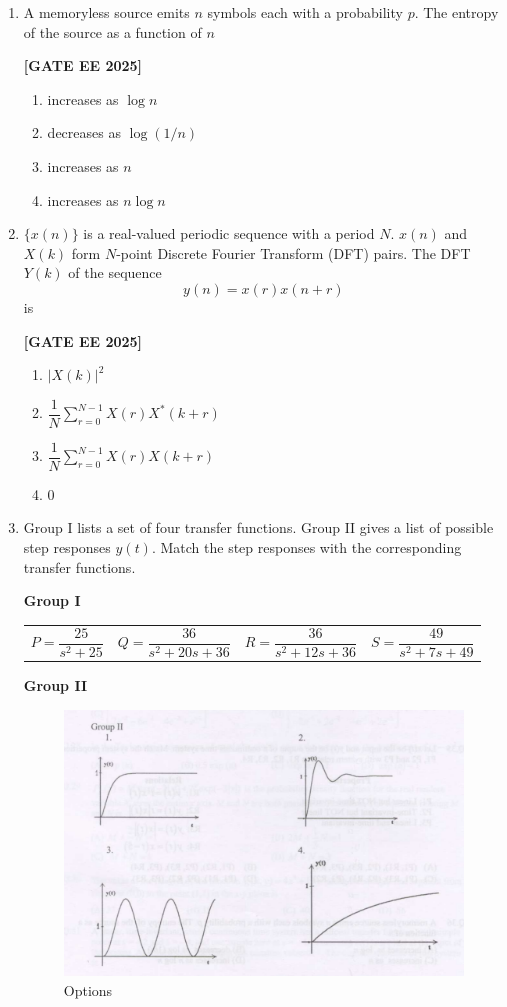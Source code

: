 \documentclass[12pt]{article}
\begin{document}
\begin{enumerate}[leftmargin=*, label=\textbf{Q.\arabic*:}]
\item A memoryless source emits $n$ symbols each with a probability $p$. The entropy of the source as a function of $n$
 
\noindent \textbf{[GATE EE 2025]}
\begin{enumerate}
  \item increases as $\log n$
  \item decreases as $\log(1/n)$
  \item increases as $n$
  \item increases as $n \log n$
\end{enumerate}

\item $\{x(n)\}$ is a real-valued periodic sequence with a period $N$. $x(n)$ and $X(k)$ form $N$-point Discrete Fourier Transform (DFT) pairs. The DFT $Y(k)$ of the sequence
\[
y(n) = x(r) x(n + r)
\]
is
 
\noindent \textbf{[GATE EE 2025]}
\begin{enumerate}
  \item $|X(k)|^2 $
  \item $\dfrac{1}{N} \sum_{r=0}^{N-1} X(r) X^*(k+r) $
  \item $\dfrac{1}{N} \sum_{r=0}^{N-1} X(r) X(k+r) $
  \item $0$
\end{enumerate}

\item
Group I lists a set of four transfer functions. Group II gives a list of possible step responses $y(t)$. Match the step responses with the corresponding transfer functions.

\textbf{Group I}

\begin{tabular}{llll}
  $P = \dfrac{25}{s^2 + 25 }$ &
  $Q = \dfrac{36}{s^2 + 20s + 36}$ &
  $R = \dfrac{36}{s^2 + 12s + 36 }$ &
  $S = \dfrac{49}{s^2 + 7s + 49}$
\end{tabular}

\textbf{Group II}
\begin{figure}[H]\centering
\includegraphics[width=0.9\columnwidth]{figs/q38.png}
\caption{Options}
\label{fig:q38}
\end{figure}
 

\end{enumerate}
\end{document}
